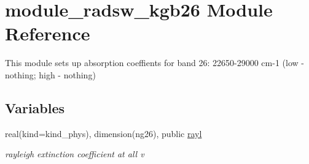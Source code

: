 \hypertarget{namespacemodule__radsw__kgb26}{}\section{module\+\_\+radsw\+\_\+kgb26 Module Reference}
\label{namespacemodule__radsw__kgb26}


This module sets up absorption coeffients for band 26\+: 22650-\/29000 cm-\/1 (low -\/ nothing; high -\/ nothing)  


\subsection*{Variables}
\begin{DoxyCompactItemize}
\item 
\mbox{\label{namespacemodule__radsw__kgb26_ab090be57484d2c5b67dda3d83c1c542b}} 
real(kind=kind\+\_\+phys), dimension(ng26), public \hyperlink{namespacemodule__radsw__kgb26_ab090be57484d2c5b67dda3d83c1c542b}{rayl}
\begin{DoxyCompactList}\small\item\em rayleigh extinction coefficient at all v \end{DoxyCompactList}\end{DoxyCompactItemize}
